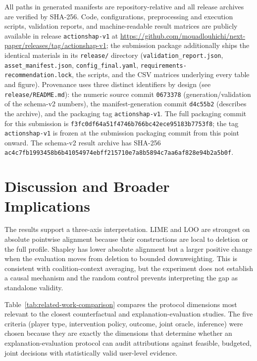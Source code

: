 \documentclass[pdflatex,sn-mathphys-num]{sn-jnl}
\theoremstyle{thmstyleone}
\theoremstyle{thmstyletwo}
\theoremstyle{thmstylethree}
\begin{document}
All paths in generated manifests are repository-relative and all release archives are verified by SHA-256. Code, configurations, preprocessing and execution scripts, validation reports, and machine-readable result matrices are publicly available in release \texttt{actionshap-v1} at \url{https://github.com/mouadlouhichi/next-paper/releases/tag/actionshap-v1}; the submission package additionally ships the identical materials in its \texttt{release/} directory (\texttt{validation\_report.json}, \texttt{asset\_manifest.json}, \texttt{config\_final.yaml}, \texttt{requirements-recommendation.lock}, the scripts, and the CSV matrices underlying every table and figure). Provenance uses three distinct identifiers by design (see \texttt{release/README.md}): the numeric source commit \texttt{0673378} (generation/validation of the schema-v2 numbers), the manifest-generation commit \texttt{d4c55b2} (describes the archive), and the packaging tag \texttt{actionshap-v1}. The full packaging commit for this submission is \texttt{f3fc0df64a51f4746b766bc42ece95183b7753f8}; the tag \texttt{actionshap-v1} is frozen at the submission packaging commit from this point onward. The schema-v2 result archive has SHA-256 \texttt{ac4c7fb1993458b6b41054974ebff215710e7a8b5894c7aa6af828e94b2a5b0f}.


\section{Discussion and Broader Implications}
The results support a three-axis interpretation. LIME and LOO are strongest on absolute pointwise alignment because their constructions are local to deletion or the full profile. Shapley has lower absolute alignment but a larger positive change when the evaluation moves from deletion to bounded downweighting. This is consistent with coalition-context averaging, but the experiment does not establish a causal mechanism and the random control prevents interpreting the gap as standalone validity.

Table~\ref{tab:related-work-comparison} compares the protocol dimensions most relevant to the closest counterfactual and explanation-evaluation studies. The five criteria (player type, intervention policy, outcome, joint oracle, inference) were chosen because they are exactly the dimensions that determine whether an explanation-evaluation protocol can audit attributions against feasible, budgeted, joint decisions with statistically valid user-level evidence.
\end{document}
